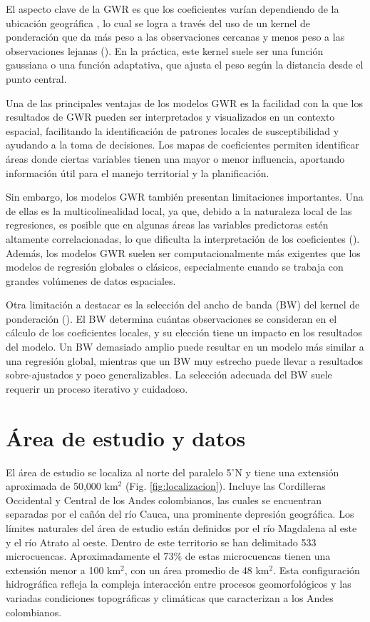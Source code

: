 \documentclass[
  manuscript=article,  
  layout=preprint,  
]{format}
\begin{document}
El aspecto clave de la GWR es que los coeficientes  varían dependiendo de la ubicación geográfica , lo cual se logra a través del uso de un kernel de ponderación que da más peso a las observaciones cercanas y menos peso a las observaciones lejanas (\cite{fotheringham2000quantitative}). En la práctica, este kernel suele ser una función gaussiana o una función adaptativa, que ajusta el peso según la distancia desde el punto central.

Una de las principales ventajas de los modelos GWR es la facilidad con la que los resultados de GWR pueden ser interpretados y visualizados en un contexto espacial, facilitando la identificación de patrones locales de susceptibilidad y ayudando a la toma de decisiones. Los mapas de coeficientes permiten identificar áreas donde ciertas variables tienen una mayor o menor influencia, aportando información útil para el manejo territorial y la planificación.

Sin embargo, los modelos GWR también presentan limitaciones importantes. Una de ellas es la multicolinealidad local, ya que, debido a la naturaleza local de las regresiones, es posible que en algunas áreas las variables predictoras estén altamente correlacionadas, lo que dificulta la interpretación de los coeficientes (\cite{fotheringham2000quantitative, brunsdon1996geographically}). Además, los modelos GWR suelen ser computacionalmente más exigentes que los modelos de regresión globales o clásicos, especialmente cuando se trabaja con grandes volúmenes de datos espaciales.

Otra limitación a destacar es la selección del ancho de banda (BW) del kernel de ponderación (\cite{guo2008comparison}). El BW determina cuántas observaciones se consideran en el cálculo de los coeficientes locales, y su elección tiene un impacto en los resultados del modelo. Un BW demasiado amplio puede resultar en un modelo más similar a una regresión global, mientras que un BW muy estrecho puede llevar a resultados sobre-ajustados y poco generalizables. La selección adecuada del BW suele requerir un proceso iterativo y cuidadoso.

\section{Área de estudio y datos}

\par El área de estudio se localiza al norte del paralelo 5$^{\circ}$N y tiene una extensión aproximada de 50,000 km$^2$ (Fig. \ref{fig:localizacion}). Incluye las Cordilleras Occidental y Central de los Andes colombianos, las cuales se encuentran separadas por el cañón del río Cauca, una prominente depresión geográfica. Los límites naturales del área de estudio están definidos por el río Magdalena al este y el río Atrato al oeste. Dentro de este territorio se han delimitado 533 microcuencas. Aproximadamente el 73\% de estas microcuencas tienen una extensión menor a 100 km$^2$, con un área promedio de 48 km$^2$. Esta configuración hidrográfica refleja la compleja interacción entre procesos geomorfológicos y las variadas condiciones topográficas y climáticas que caracterizan a los Andes colombianos.
\end{document}
